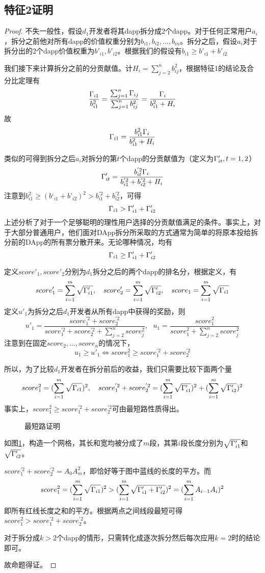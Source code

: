\subsection{特征2证明}
\label{subsection:proof2}
\begin{proof}
	 不失一般性，假设$d_1$开发者将其dapp拆分成2个dapp。对于任何正常用户$a_i$，拆分之前他对所有dapp的价值权重分别为$b_{i1},b_{i2},...,b_{in}$。拆分之后，假设$a_i$对于拆分出的$2$个dapp价值权重为$b'_{i1},b'_{i2}$。根据我们的假设有$b_{i1} \geq b'_{i1}+b'_{i2}$

	 我们接下来计算拆分之前的分贡献值。计$H_i = \sum_{j=2}^n b_{ij}^2$，根据特征1的结论及合分比定理有
	 $$\frac{\Gamma_{i1}}{b_{i1}^2} = \frac{\sum_{j=1}^n \Gamma_{ij}}{\sum_{j=1}^n b_{ij}^2} = \frac{\Gamma_i}{b_{i1}^2+H_i}$$
	 故
	 $$\Gamma_{i1}=\frac{b_{i1}^2\Gamma_i}{b_{i1}^2+H_i}$$

     类似的可得到拆分之后$a_i$对拆分的第$t$个dapp的分贡献值为（定义为$\Gamma'_{it},t=1,2$）
	 $$\Gamma'_{it} =  \frac{b_{it}^{'2}\Gamma_i}{b_{i1}^{'2}+b_{i2}^{'2}+H_i}$$
	 注意到$b_{i1}^2 \geq (b‘_{i1}+b’_{i2})^2 >b_{i1}^{'2}+b_{i2}^{'2}$，可得
	 $$\Gamma_{i1} > \Gamma'_{i1}+\Gamma'_{i2}$$
	 上述分析了对于一个足够聪明的理性用户选择的分贡献值满足的条件。事实上，对于大部分普通用户，他们面对DApp拆分所采取的方式通常为简单的将原本投给拆分前的DApp的所有票分散开来。无论哪种情况，均有
	 	$$\Gamma_{i1} \geq \Gamma'_{i1}+\Gamma'_{i2}$$

	 定义$score'_1,score'_2$分别为$d_1$拆分之后的两个dapp的排名分，根据定义，有
	 $$score'_1 =  \sum_{i=1}^m \sqrt{\Gamma'_{i1}},~~~score'_2 =  \sum_{i=1}^m \sqrt{\Gamma'_{i2}},~~~score_1 = \sum_{i=1}^m \sqrt{\Gamma_{i1}}$$
	 定义$u'_1$为拆分之后$d_1$开发者从所有dapp中获得的奖励，则
	 $$u'_1=\frac{score_1^{'2}+score_2^{'2}}{score_1^{'2}+score_2^{'2}+\sum_{j=2}^n score_j^2},~~~u_1=\frac{score^2_1}{score_1^2+\sum_{j=2}^n score_j^2}$$
	 注意到在固定$score_2,...,score_n$的情况下，
	 $$ u_1 \geq u'_1 \Leftrightarrow score_1^2 \geq score_1^{'2}+score_2^{'2}$$

	 所以，为了比较$d_1$开发者在拆分前后的收益，我们只需要比较下面两个量
	 $$score_1^2 = (\sum_{i=1}^m \sqrt{\Gamma_{i1}})^2,~~~score_1^{'2}+score_2^{'2}=  (\sum_{i=1}^m \sqrt{\Gamma'_{i1}})^2+(\sum_{i=1}^m \sqrt{\Gamma'_{i2}})^2$$
	 事实上，$score_1^2 \geq score_1^{'2}+score_2^{'2}$可由最短路性质得出。
	 \begin{figure}
	 	\centering
    
	 	\caption{最短路证明 \label{fig:path}}
	 \end{figure}
	 如图\ref{fig:path}，构造一个网格，其长和宽均被分成了$m$段，其第$i$段长度分别为$\sqrt{\Gamma'_{i1}}$和$\sqrt{\Gamma'_{i2}}$。

	 $score_1^{'2}+score_2^{'2}=A_0A_m^2$，即恰好等于图中蓝线的长度的平方。而
	 $$score_1^2 = (\sum_{i=1}^m \sqrt{\Gamma_{i1}})^2 > (\sum_{i=1}^m \sqrt{\Gamma'_{i1}+\Gamma'_{i2}})^2 = (\sum_{i=1}^m A_{i-1}A_i)^2$$
	 即所有红线长度之和的平方。根据两点之间线段最短可得$score_1^2 >score_1^{'2}+score_2^{'2}$。

	 对于拆分成$k>2$个dapp的情形，只需转化成逐次拆分然后每次应用$k=2$时的结论即可。

	 故命题得证。
\end{proof}

